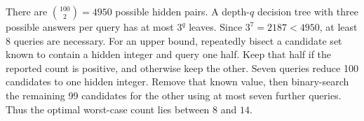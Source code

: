 There are $\binom{100}{2}=4950$ possible hidden pairs. A depth-$q$ decision tree with three possible answers per query has at most $3^q$ leaves. Since $3^7=2187<4950$, at least 8 queries are necessary. For an upper bound, repeatedly bisect a candidate set known to contain a hidden integer and query one half. Keep that half if the reported count is positive, and otherwise keep the other. Seven queries reduce 100 candidates to one hidden integer. Remove that known value, then binary-search the remaining 99 candidates for the other using at most seven further queries. Thus the optimal worst-case count lies between $\boxed8$ and $\boxed{14}$.
